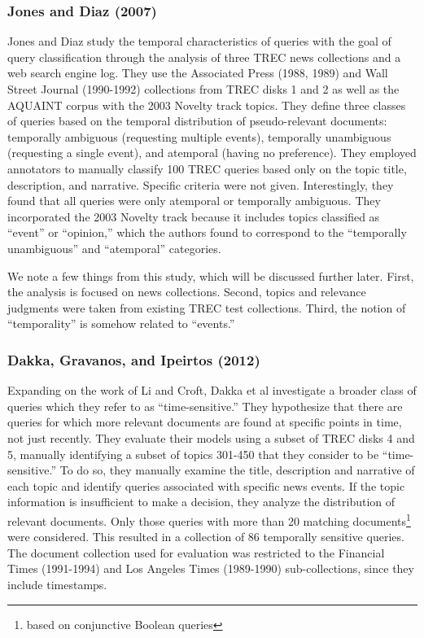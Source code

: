 \documentclass{sig-alternate}
\begin{document}
\subsubsection{Jones and Diaz (2007)}
Jones and Diaz \cite{Jones2007} study the temporal characteristics of queries with the goal of query classification through the analysis of three TREC news collections and a web search engine log. They use the Associated Press (1988, 1989) and Wall Street Journal (1990-1992) collections from TREC disks 1 and 2 as well as the AQUAINT corpus with the 2003 Novelty track topics. They define three classes of queries based on the temporal distribution of pseudo-relevant documents: temporally ambiguous (requesting multiple events),  temporally unambiguous (requesting a single event), and atemporal (having no preference). They employed annotators to  manually classify 100 TREC queries based only on the topic title, description, and narrative. Specific criteria were not given. Interestingly, they found that all queries were only atemporal or temporally ambiguous. They incorporated the 2003 Novelty track because it includes topics classified as ``event'' or ``opinion,'' which the authors found to correspond to the ``temporally unambiguous'' and ``atemporal'' categories. 

We note a few things from this study, which will be discussed further later. First, the analysis is focused on news collections. Second, topics and relevance judgments were taken from existing TREC test collections. Third, the notion of ``temporality'' is somehow related to ``events.'' 

\subsubsection{Dakka, Gravanos, and Ipeirtos (2012)}

Expanding on the work of Li and Croft, Dakka et al \cite{Dakka2012} investigate a broader class of queries which they refer to as ``time-sensitive.'' They hypothesize that there are queries for which more relevant documents are found at specific points in time, not just recently. They evaluate their models using a subset of TREC disks 4 and 5, manually identifying a subset of topics 301-450 that they consider to be ``time-sensitive.'' To do so, they manually examine the title, description and narrative of each topic and identify queries associated with specific news events. If the topic information is insufficient to make a decision, they analyze the distribution of relevant documents. Only those queries with more than 20 matching documents\footnote{based on conjunctive Boolean queries} were considered. This resulted in a collection of 86 temporally sensitive queries. The document collection used for evaluation was restricted to the Financial Times (1991-1994) and Los Angeles Times (1989-1990) sub-collections, since they include timestamps. 
\end{document}
